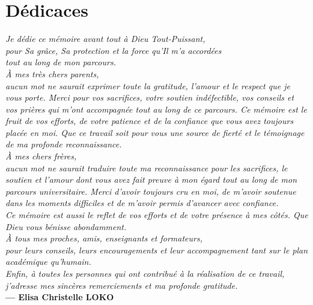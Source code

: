 \chapter*{Dédicaces}


\begin{flushright}
\normalsize

\textit{Je dédie ce mémoire avant tout à Dieu Tout-Puissant,}\\
\textit{pour Sa grâce, Sa protection et la force qu’Il m’a accordées}\\
\textit{tout au long de mon parcours.}\\[0.2cm]

\textit{À mes très chers parents,}\\
\textit{aucun mot ne saurait exprimer toute la gratitude, l’amour et le respect que je vous porte. Merci pour vos sacrifices, votre soutien indéfectible, vos conseils et vos prières qui m'ont accompagnée tout au long de ce parcours. Ce mémoire est le fruit de vos efforts, de votre patience et de la confiance que vous avez toujours placée en moi. Que ce travail soit pour vous une source de fierté et le témoignage de ma profonde reconnaissance.}\\[0.2cm]

\textit{À mes chers frères,}\\
\textit{aucun mot ne saurait traduire toute ma reconnaissance pour les sacrifices, le soutien et l’amour dont vous avez fait preuve à mon égard tout au long de mon parcours universitaire. Merci d’avoir toujours cru en moi, de m'avoir soutenue dans les moments difficiles et de m’avoir permis d’avancer avec confiance.}\\
\textit{Ce mémoire est aussi le reflet de vos efforts et de votre présence à mes côtés. Que Dieu vous bénisse abondamment.}\\[0.2cm]

\textit{À tous mes proches, amis, enseignants et formateurs,}\\
\textit{pour leurs conseils, leurs encouragements et leur accompagnement tant sur le plan académique qu’humain.}\\[0.2cm]

\textit{Enfin, à toutes les personnes qui ont contribué à la réalisation de ce travail, j’adresse mes sincères remerciements et ma profonde gratitude.}\\[0.4cm]

\textbf{--- Elisa Christelle LOKO}

\end{flushright}

